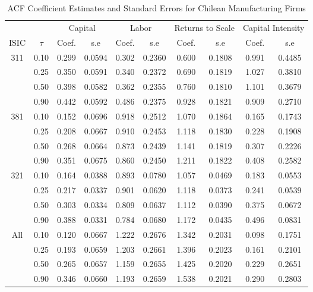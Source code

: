 \begin{table}[ht]
\centering
\caption{ACF Coefficient Estimates and Standard Errors for Chilean Manufacturing Firms} 
\begin{tabular}{cccccccccc}
  \hline\hline & & \multicolumn{2}{c}{Capital}  & \multicolumn{2}{c}{Labor} & \multicolumn{2}{c}{Returns to Scale} & \multicolumn{2}{c}{Capital Intensity}\\ \cmidrule(lr){3-4} \cmidrule(lr){5-6} \cmidrule(lr){7-8} \cmidrule(lr){9-10}ISIC & $\tau$ & Coef. & s.e & Coef. & s.e & Coef. & s.e & Coef. & s.e \\ 
  \hline
311 & 0.10 & 0.299 & 0.0594 & 0.302 & 0.2360 & 0.600 & 0.1808 & 0.991 & 0.4485 \\ 
   & 0.25 & 0.350 & 0.0591 & 0.340 & 0.2372 & 0.690 & 0.1819 & 1.027 & 0.3810 \\ 
   & 0.50 & 0.398 & 0.0582 & 0.362 & 0.2355 & 0.760 & 0.1810 & 1.101 & 0.3679 \\ 
   & 0.90 & 0.442 & 0.0592 & 0.486 & 0.2375 & 0.928 & 0.1821 & 0.909 & 0.2710 \\ 
  381 & 0.10 & 0.152 & 0.0696 & 0.918 & 0.2512 & 1.070 & 0.1864 & 0.165 & 0.1743 \\ 
   & 0.25 & 0.208 & 0.0667 & 0.910 & 0.2453 & 1.118 & 0.1830 & 0.228 & 0.1908 \\ 
   & 0.50 & 0.268 & 0.0664 & 0.873 & 0.2439 & 1.141 & 0.1819 & 0.307 & 0.2226 \\ 
   & 0.90 & 0.351 & 0.0675 & 0.860 & 0.2450 & 1.211 & 0.1822 & 0.408 & 0.2582 \\ 
  321 & 0.10 & 0.164 & 0.0388 & 0.893 & 0.0780 & 1.057 & 0.0469 & 0.183 & 0.0553 \\ 
   & 0.25 & 0.217 & 0.0337 & 0.901 & 0.0620 & 1.118 & 0.0373 & 0.241 & 0.0539 \\ 
   & 0.50 & 0.303 & 0.0334 & 0.809 & 0.0637 & 1.112 & 0.0390 & 0.375 & 0.0672 \\ 
   & 0.90 & 0.388 & 0.0331 & 0.784 & 0.0680 & 1.172 & 0.0435 & 0.496 & 0.0831 \\ 
  All & 0.10 & 0.120 & 0.0667 & 1.222 & 0.2676 & 1.342 & 0.2031 & 0.098 & 0.1751 \\ 
   & 0.25 & 0.193 & 0.0659 & 1.203 & 0.2661 & 1.396 & 0.2023 & 0.161 & 0.2101 \\ 
   & 0.50 & 0.265 & 0.0657 & 1.159 & 0.2655 & 1.425 & 0.2020 & 0.229 & 0.2651 \\ 
   & 0.90 & 0.346 & 0.0660 & 1.193 & 0.2659 & 1.538 & 0.2021 & 0.290 & 0.2803 \\ 
   \hline
\end{tabular}
\end{table}
